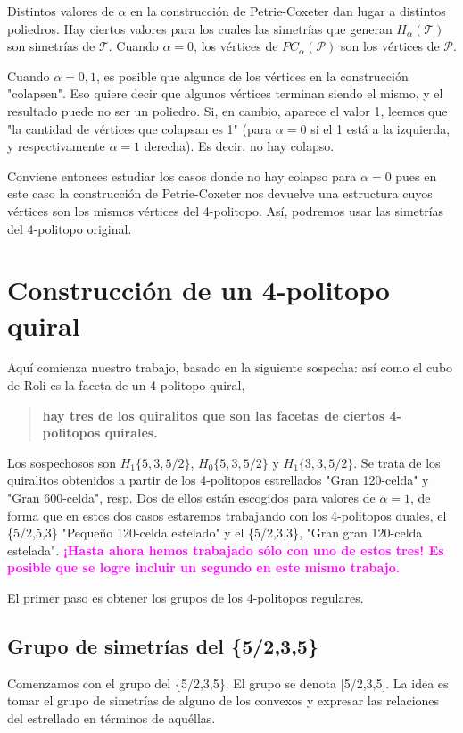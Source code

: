 \documentclass[spanish]{article}
\theoremstyle{definition}
\begin{document}
Distintos valores de $\alpha$ en la construcción de Petrie-Coxeter dan lugar a distintos poliedros. Hay ciertos valores para los cuales las simetrías que generan $H_\alpha(\mathcal{T})$ son simetrías de $\mathcal{T}$. Cuando $\alpha=0$, los vértices de $PC_\alpha(\mathcal{P})$ son los vértices de $\mathcal{P}$.

Cuando $\alpha=0,1$, es posible que algunos de los vértices en la construcción "colapsen". Eso quiere decir que algunos vértices terminan siendo el mismo, y el resultado puede no ser un poliedro. Si, en cambio, aparece el valor 1, leemos que "la cantidad de vértices que colapsan es 1" (para $\alpha=0$ si el 1 está a la izquierda, y respectivamente $\alpha=1$ derecha). Es decir, no hay colapso.

Conviene entonces estudiar los casos donde no hay colapso para $\alpha=0$ pues en este caso la construcción de Petrie-Coxeter nos devuelve una estructura cuyos vértices son los mismos vértices del 4-politopo. Así, podremos usar las simetrías del 4-politopo original.

\section{Construcción de un 4-politopo quiral}
Aquí comienza nuestro trabajo, basado en la siguiente sospecha: así como el cubo de Roli es la faceta de un 4-politopo quiral, 

\begin{quote}\textbf{hay tres de los quiralitos que son las facetas de ciertos 4-politopos quirales.}\end{quote}

Los sospechosos son $H_1\{5,3,5/2\}$, $H_0\{5,3,5/2\}$ y $H_1\{3,3,5/2\}$. Se trata de los quiralitos obtenidos a partir de los 4-politopos estrellados "Gran 120-celda" y "Gran 600-celda", resp. Dos de ellos están escogidos para valores de $\alpha=1$, de forma que en estos dos casos estaremos trabajando con los 4-politopos duales, el \{5/2,5,3\} "Pequeño 120-celda estelado" y el \{5/2,3,3\}, "Gran gran 120-celda estelada". \textcolor{magenta}{\textbf{¡Hasta ahora hemos trabajado sólo con uno de estos tres! Es posible que se logre incluir un segundo en este mismo trabajo.}}

El primer paso es obtener los grupos de los 4-politopos regulares.

\subsection{Grupo de simetrías del \{5/2,3,5\}}
Comenzamos con el grupo del \{5/2,3,5\}. El grupo se denota [5/2,3,5]. La idea es tomar el grupo de simetrías de alguno de los convexos y expresar las relaciones del estrellado en términos de aquéllas.
\end{document}
